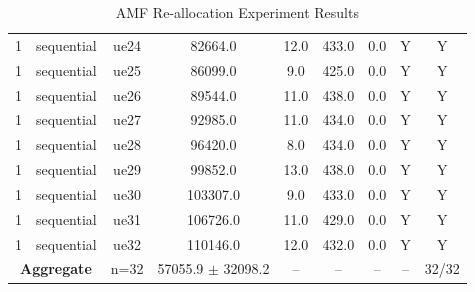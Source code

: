 \begin{table}[ht]
\begin{tabular}{|c|c|c|c|c|c|c|c|c|}
1 & sequential & ue24 & 82664.0 & 12.0 & 433.0 & 0.0 & Y & Y \\
1 & sequential & ue25 & 86099.0 & 9.0 & 425.0 & 0.0 & Y & Y \\
1 & sequential & ue26 & 89544.0 & 11.0 & 438.0 & 0.0 & Y & Y \\
1 & sequential & ue27 & 92985.0 & 11.0 & 434.0 & 0.0 & Y & Y \\
1 & sequential & ue28 & 96420.0 & 8.0 & 434.0 & 0.0 & Y & Y \\
1 & sequential & ue29 & 99852.0 & 13.0 & 438.0 & 0.0 & Y & Y \\
1 & sequential & ue30 & 103307.0 & 9.0 & 433.0 & 0.0 & Y & Y \\
1 & sequential & ue31 & 106726.0 & 11.0 & 429.0 & 0.0 & Y & Y \\
1 & sequential & ue32 & 110146.0 & 12.0 & 432.0 & 0.0 & Y & Y \\
\multicolumn{2}{|c|}{\textbf{Aggregate}} & n=32 & 57055.9 $\pm$ 32098.2 & -- & -- & -- & -- & 32/32 \\
\hline
\end{tabular}
\caption{AMF Re-allocation Experiment Results}
\label{tab:amf_realloc}
\end{table}
